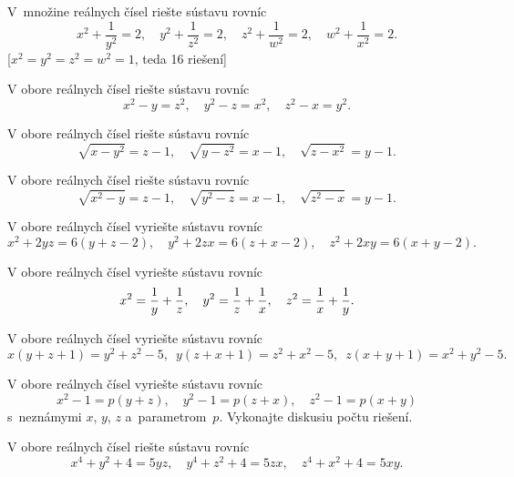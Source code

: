 {\D
V~množine reálnych čísel riešte sústavu rovníc
$$
x^2+\frac1{y^2}=2,\quad y^2+\frac1{z^2}=2,\quad z^2+\frac1{w^2}=2,\quad
w^2+\frac1{x^2}=2.
$$
[$x^2=y^2=z^2=w^2=1$, teda 16 riešení]

V obore reálnych čísel riešte sústavu rovníc
$$
x^2-y=z^2,\quad y^2-z=x^2,\quad z^2-x=y^2.
$$
\vpravo{[57--A--S--1]}

V obore reálnych čísel riešte sústavu rovníc
$$
\sqrt{x-y^2}=z-1,\quad \sqrt{y-z^2}=x-1,\quad \sqrt{z-x^2}=y-1.
$$
\vpravo{[59--A--S--1]}

V obore reálnych čísel riešte sústavu rovníc
$$
\sqrt{x^2-y}=z-1,\quad \sqrt{y^2-z}=x-1,\quad \sqrt{z^2-x}=y-1.
$$
\vpravo{[59--A--I--1]}

V obore reálnych čísel vyriešte sústavu rovníc
$$
x^2+2yz=6(y+z-2),\quad y^2+2zx=6(z+x-2),\quad z^2+2xy=6(x+y-2).
$$
\vpravo{[53--A--S--3]}

V obore reálnych čísel vyriešte sústavu rovníc
$$
\postdisplaypenalty10000
x^2=\frac1y+\frac1z,\quad y^2=\frac1z+\frac1x,\quad z^2=\frac1x+\frac1y.
$$
\vpravo{[53--A--I--6]}

V obore reálnych čísel vyriešte sústavu rovníc
$$
x(y+z+1)=y^2+z^2-5,\enspace y(z+x+1)=z^2+x^2-5,\enspace z(x+y+1)=x^2+y^2-5.
$$
\vpravo{[54--A--II--2]}

V obore reálnych čísel vyriešte sústavu rovníc
$$
x^2-1=p(y+z),\quad y^2-1=p(z+x),\quad z^2-1=p(x+y)
$$
s~neznámymi $x$, $y$, $z$ a~parametrom~$p$. Vykonajte diskusiu počtu riešení.
\vpravo{[51--A--II--4]}

V obore reálnych čísel riešte sústavu rovníc
$$
x^4+y^2+4=5yz,\quad y^4+z^2+4=5zx,\quad z^4+x^2+4=5xy.
$$
\vpravo{[61--A--III--6]}
}


